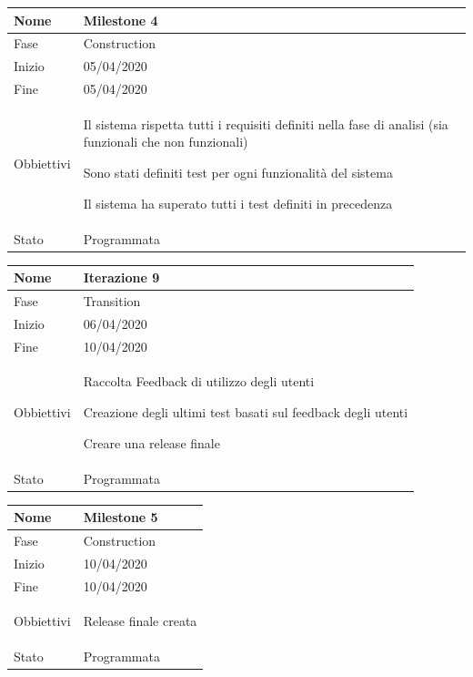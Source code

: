 \begin{center}
\begin{tabular}{ |p{2cm}|p{10cm}|  }
\hline
Nome & Milestone 4\\\hline
Fase & Construction \\\hline
Inizio & 05/04/2020 \\\hline
Fine &  05/04/2020 \\\hline
Obbiettivi & 
	\begin{compactitem}
		\item Il sistema rispetta tutti i requisiti definiti nella fase di analisi (sia funzionali che non funzionali)
		\item Sono stati definiti test per ogni funzionalità del sistema
		\item Il sistema ha superato tutti i test definiti in precedenza
	\end{compactitem}\\\hline
Stato &  Programmata \\\hline
\end{tabular}
\label{table:milestone4}\newline

\begin{tabular}{ |p{2cm}|p{10cm}|  }
\hline
Nome & Iterazione 9 \\\hline
Fase & Transition \\\hline
Inizio & 06/04/2020 \\\hline
Fine &  10/04/2020  \\\hline
Obbiettivi & 
	\begin{compactitem}
		\item Raccolta Feedback di utilizzo degli utenti
		\item Creazione degli ultimi test basati sul feedback degli utenti
		\item Creare una release finale
	\end{compactitem}\\\hline
Stato &  Programmata \\\hline
\end{tabular}
\label{table:9}\newline

\begin{tabular}{ |p{2cm}|p{10cm}|  }
\hline
Nome & Milestone 5\\\hline
Fase & Construction \\\hline
Inizio & 10/04/2020 \\\hline
Fine &  10/04/2020 \\\hline
Obbiettivi & 
	\begin{compactitem}
		\item Release finale creata
	\end{compactitem}\\\hline
Stato &  Programmata \\\hline
\end{tabular}
\label{table:milestone5}\newline


\end{center}

